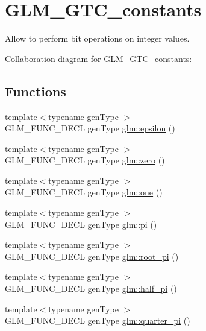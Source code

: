 \hypertarget{group__gtc__constants}{}\section{G\+L\+M\+\_\+\+G\+T\+C\+\_\+constants}
\label{group__gtc__constants}


Allow to perform bit operations on integer values.  


Collaboration diagram for G\+L\+M\+\_\+\+G\+T\+C\+\_\+constants\+:
\subsection*{Functions}
\begin{DoxyCompactItemize}
\item 
{\footnotesize template$<$typename gen\+Type $>$ }\\G\+L\+M\+\_\+\+F\+U\+N\+C\+\_\+\+D\+E\+C\+L gen\+Type \hyperlink{group__gtc__constants_gacb41049b8d22c8aa90e362b96c524feb}{glm\+::epsilon} ()
\item 
{\footnotesize template$<$typename gen\+Type $>$ }\\G\+L\+M\+\_\+\+F\+U\+N\+C\+\_\+\+D\+E\+C\+L gen\+Type \hyperlink{group__gtc__constants_ga5cc97dd01d37fc199264ff6030578435}{glm\+::zero} ()
\item 
{\footnotesize template$<$typename gen\+Type $>$ }\\G\+L\+M\+\_\+\+F\+U\+N\+C\+\_\+\+D\+E\+C\+L gen\+Type \hyperlink{group__gtc__constants_ga8186ec2c330457d41d9686c47cd3b2d1}{glm\+::one} ()
\item 
{\footnotesize template$<$typename gen\+Type $>$ }\\G\+L\+M\+\_\+\+F\+U\+N\+C\+\_\+\+D\+E\+C\+L gen\+Type \hyperlink{group__gtc__constants_gae671930537266a9a650ccb4b88757692}{glm\+::pi} ()
\item 
{\footnotesize template$<$typename gen\+Type $>$ }\\G\+L\+M\+\_\+\+F\+U\+N\+C\+\_\+\+D\+E\+C\+L gen\+Type \hyperlink{group__gtc__constants_ga1cfeb345f34f72697d14f4db8d5d4c6c}{glm\+::root\+\_\+pi} ()
\item 
{\footnotesize template$<$typename gen\+Type $>$ }\\G\+L\+M\+\_\+\+F\+U\+N\+C\+\_\+\+D\+E\+C\+L gen\+Type \hyperlink{group__gtc__constants_ga7f7a1050729f3b03b1873a06ba4a472f}{glm\+::half\+\_\+pi} ()
\item 
{\footnotesize template$<$typename gen\+Type $>$ }\\G\+L\+M\+\_\+\+F\+U\+N\+C\+\_\+\+D\+E\+C\+L gen\+Type \hyperlink{group__gtc__constants_ga0148d757b4bfda4d86251b8d1ea1dad3}{glm\+::quarter\+\_\+pi} ()

\end{DoxyCompactItemize}
